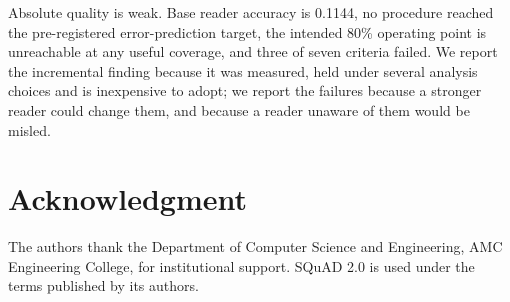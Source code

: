 \documentclass[conference]{IEEEtran}
\begin{document}
Absolute quality is weak. Base reader accuracy is 0.1144, no procedure reached the
pre-registered error-prediction target, the intended 80\% operating point is
unreachable at any useful coverage, and three of seven criteria failed. We report the
incremental finding because it was measured, held under several analysis choices and
is inexpensive to adopt; we report the failures because a stronger reader could
change them, and because a reader unaware of them would be misled.

\section*{Acknowledgment}
The authors thank the Department of Computer Science and Engineering, AMC
Engineering College, for institutional support. SQuAD 2.0 is used under the terms
published by its authors.
\end{document}
